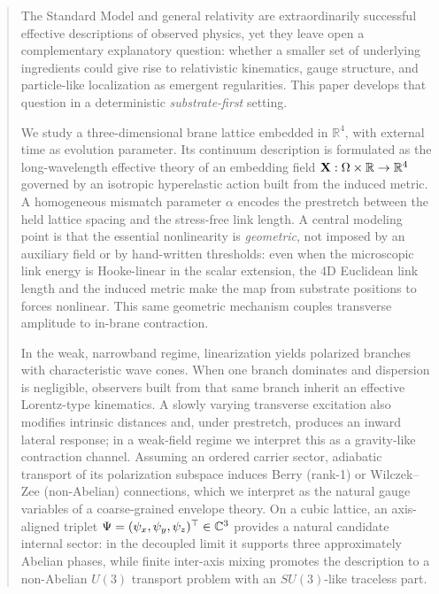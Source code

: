 \begin{abstract}
The Standard Model and general relativity are extraordinarily successful effective descriptions of observed physics,
yet they leave open a complementary explanatory question: whether a smaller set of underlying ingredients could give
rise to relativistic kinematics, gauge structure, and particle-like localization as emergent regularities.
This paper develops that question in a deterministic \emph{substrate-first} setting.

We study a three-dimensional brane lattice embedded in $\mathbb{R}^4$, with external time as evolution parameter.
Its continuum description is formulated as the long-wavelength effective theory of an embedding field
$\vecX:\Omega\times\mathbb{R}\to\mathbb{R}^4$ governed by an isotropic hyperelastic action built from the induced metric.
A homogeneous mismatch parameter $\alpha$ encodes the prestretch between the held lattice spacing and the stress-free
link length.
A central modeling point is that the essential nonlinearity is \emph{geometric}, not imposed by an auxiliary field or by
hand-written thresholds: even when the microscopic link energy is Hooke-linear in the scalar extension,
the 4D Euclidean link length and the induced metric make the map from substrate positions to forces nonlinear.
This same geometric mechanism couples transverse amplitude to in-brane contraction.

In the weak, narrowband regime, linearization yields polarized branches with characteristic wave cones.
When one branch dominates and dispersion is negligible, observers built from that same branch inherit an effective
Lorentz-type kinematics.
A slowly varying transverse excitation also modifies intrinsic distances and, under prestretch, produces an inward
lateral response; in a weak-field regime we interpret this as a gravity-like contraction channel.
Assuming an ordered carrier sector, adiabatic transport of its polarization subspace induces Berry (rank-1) or
Wilczek--Zee (non-Abelian) connections, which we interpret as the natural gauge variables of a coarse-grained
envelope theory.
On a cubic lattice, an axis-aligned triplet $\Psi=(\psi_x,\psi_y,\psi_z)^\top\in\C^3$ provides a natural candidate
internal sector: in the decoupled limit it supports three approximately Abelian phases, while finite inter-axis mixing
promotes the description to a non-Abelian $U(3)$ transport problem with an $SU(3)$-like traceless part.


\end{abstract}
